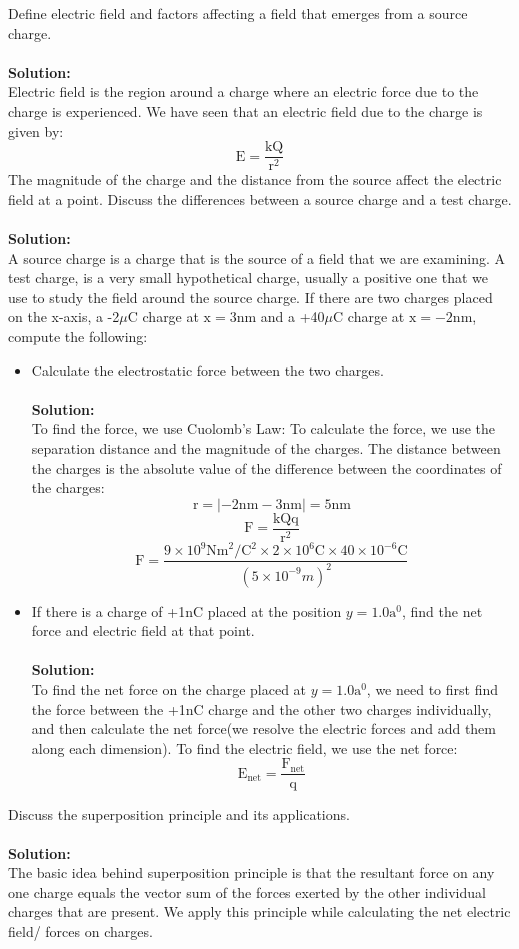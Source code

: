 \documentclass[9pt,addpoints]{exam}
\begin{document}
	\begin{questions}
		\question Define electric field and factors affecting a field that emerges from a source charge. \\ \\
		\textbf{Solution:} \\
		Electric field is the region around a charge where an electric force due to the charge is experienced. We have seen that an electric field due to the charge is given by:
		$$\text{E}=\dfrac{\text{kQ}}{\text{r}^2}$$
		The magnitude of the charge and the distance from the source affect the electric field at a point.
		\question Discuss the differences between a source charge and a test charge. \\ \\
		\textbf{Solution:} \\
		A source charge is a charge that is the source of a field that we are examining. A test charge, is a very small hypothetical charge, usually  a positive one that we use to study the field around the source charge.
		\question If there are two charges placed on the x-axis, a -2$\mu\text{C}$ charge at $\text{x}=3\text{nm}$ and a +40$\mu\text{C}$ charge at $\text{x}=-2\text{nm}$, compute the following:
		\begin{itemize}
			\item Calculate the electrostatic force between the two charges.\\ \\
			\textbf{Solution:} \\
			To find the force, we use Cuolomb's Law:
			To calculate the force, we use the separation distance and the magnitude of the charges. The distance between the charges is the absolute value of the difference between the coordinates of the charges:
			$$\text{r}=|-2\text{nm}-3\text{nm}|=5\text{nm}$$
			$$\text{F}=\dfrac{\text{kQq}}{\text{r}^2}$$
			$$\text{F}=\dfrac{9\times10^{9}\text{Nm}^2/\text{C}^2\times2\times10^{6}\text{C}\times40\times10^{-6}\text{C}}{(5\times10^{-9}m)^2}$$
			\item If there is a charge of +1nC placed at the position $y=1.0\text{a}^0$, find the net force and electric field at that point.\\ \\
			\textbf{Solution:} \\
			To find the net force on the charge placed at $y=1.0\text{a}^0$, we need to first find the force between the +1nC charge and the other two charges individually, and then calculate the net force(we resolve the electric forces and add them along each dimension).	To find the electric field, we use the net force:
			$$\text{E}_{\text{net}}=\dfrac{\text{F}_{\text{net}}}{\text{q}}$$	
		\end{itemize}
		\question Discuss the superposition principle and its applications. \\ \\
		\textbf{Solution:} \\
		The basic idea behind superposition principle is that the resultant force on any one charge equals the vector sum of the forces exerted by the other individual charges that are present. We apply this principle while calculating the net electric field/ forces on charges.
		

\end{questions}
\end{document}
